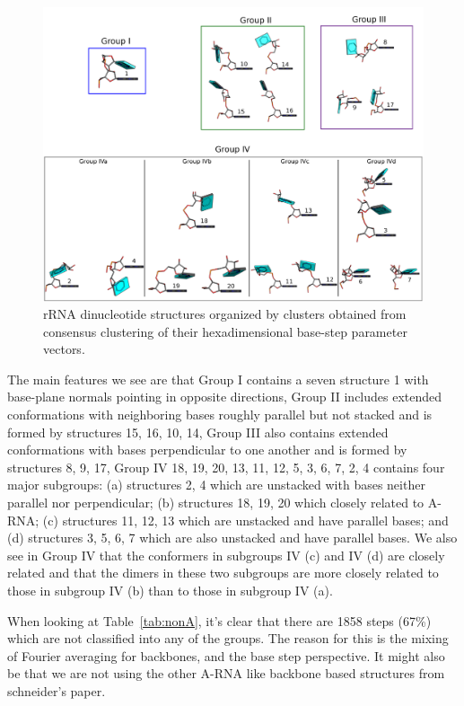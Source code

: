 \begin{figure}[htbp]
 \centering
\includegraphics[angle=90, scale=0.5]{Chapter2/collageb.png}
 \caption{rRNA dinucleotide structures organized by clusters obtained from
consensus clustering of their hexadimensional base-step parameter vectors.}
 \label{fig:nonAclus}
\end{figure}



The main features we see are that Group I contains a seven structure
{1} with base-plane normals  pointing in opposite directions, Group II
includes  extended   conformations  with  neighboring   bases  roughly
parallel but not stacked and is formed by structures {15, 16, 10, 14},
Group   III   also   contains   extended  conformations   with   bases
perpendicular to one  another and is formed by  structures {8, 9, 17},
Group IV  {18, 19, 20,  13, 11, 12,  5, 3, 6,  7, 2, 4}  contains four
major subgroups: (a) structures {2,  4} which are unstacked with bases
neither parallel nor perpendicular;  (b) structures {18, 19, 20} which
closely  related to  A-RNA;  (c)  structures {11,  12,  13} which  are
unstacked and  have parallel  bases; and (d)  structures {3, 5,  6, 7}
which are also unstacked and have parallel bases. We also see in Group
IV that  the conformers  in subgroups  IV (c) and  IV (d)  are closely
related and  that the dimers in  these two subgroups  are more closely
related to those in subgroup IV (b) than to those in subgroup IV (a).


When looking at Table~\ref{tab:nonA}, it's clear that there are 1858
steps (67\%) which are not classified into any of the groups. The reason for
this is the mixing of Fourier averaging for backbones, and the
base step perspective. It might also be that we are not using the
other A-RNA like backbone based structures from schneider's paper.

